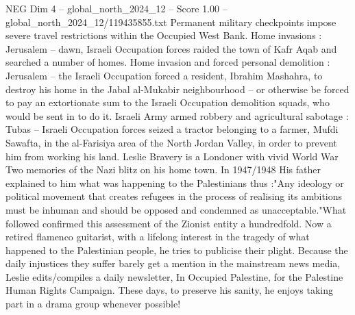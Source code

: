 \begin{textsample}{NEG Dim 4 – global\_north\_2024\_12 – Score 1.00 – global\_north\_2024\_12/119435855.txt}
Permanent military checkpoints impose severe travel restrictions within the Occupied West Bank.
Home invasions : Jerusalem -- dawn, Israeli Occupation forces raided the town of Kafr Aqab and searched a number of homes.
Home invasion and forced personal demolition : Jerusalem -- the Israeli Occupation forced a resident, Ibrahim Mashahra, to destroy his home in the Jabal al-Mukabir neighbourhood -- or otherwise be forced to pay an extortionate sum to the Israeli Occupation demolition squads, who would be sent in to do it.
Israeli Army armed robbery and agricultural sabotage : Tubas -- Israeli Occupation forces seized a tractor belonging to a farmer, Mufdi Sawafta, in the al-Farisiya area of the North Jordan Valley, in order to prevent him from working his land.
Leslie Bravery is a Londoner with vivid World War Two memories of the Nazi blitz on his home town.
In 1947/1948 His father explained to him what was happening to the Palestinians thus :"Any ideology or political movement that creates refugees in the process of realising its ambitions must be inhuman and should be opposed and condemned as unacceptable."What followed confirmed this assessment of the Zionist entity a hundredfold.
Now a retired flamenco guitarist, with a lifelong interest in the tragedy of what happened to the Palestinian people, he tries to publicise their plight.
Because the daily injustices they suffer barely get a mention in the mainstream news media, Leslie edits/compiles a daily newsletter, In Occupied Palestine, for the Palestine Human Rights Campaign.
These days, to preserve his sanity, he enjoys taking part in a drama group whenever possible!

\end{textsample}
